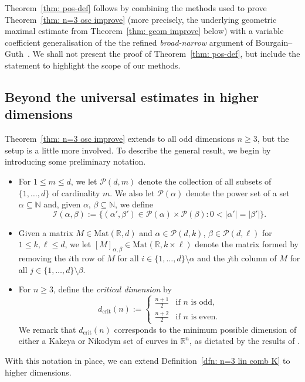 \documentclass[reqno]{amsart}
\numberwithin{equation}{section}
\newcommand{\N}{\mathbb{N}}
\newcommand{\R}{\mathbb{R}}
\newcommand{\cI}{\mathcal{I}}
\newcommand{\cP}{\mathcal{P}}
\theoremstyle{plain}
\theoremstyle{definition}
\newcommand{\crit}{\mathrm{crit}}
\begin{document}
Theorem~\ref{thm: pos-def} follows by combining the methods used to prove Theorem~\ref{thm: n=3 osc improve} (more precisely, the underlying geometric maximal estimate from Theorem~\ref{thm: geom improve} below) with a variable coefficient generalisation of the the refined \textit{broad-narrow} argument of Bourgain--Guth~\cite[\S4]{BG2011}. We shall not present the proof of Theorem~\ref{thm: pos-def}, but include the statement to highlight the scope of our methods. 




\subsection{Beyond the universal estimates in higher dimensions}\label{subsec: beyond higher} Theorem~\ref{thm: n=3 osc improve} extends to all odd dimensions $n \geq 3$, but the setup is a little more involved. To describe the general result, we begin by introducing some preliminary notation. 
\begin{itemize}
    \item For $1 \leq m \leq d$, we let $\cP(d,m)$ denote the collection of all subsets of $\{1, \dots, d\}$ of cardinality $m$. We also let $\cP(\alpha)$ denote the power set of a set $\alpha \subseteq \N$ and, given $\alpha$, $\beta \subseteq \N$, we define
    \begin{equation*}
        \cI(\alpha,\beta) := \{(\alpha',\beta') \in \cP(\alpha) \times \cP(\beta) : 0 < |\alpha'| = |\beta'|\}.
    \end{equation*} 
    \item Given a matrix $M \in \mathrm{Mat}(\R, d)$ and $\alpha \in \cP(d, k)$, $\beta \in \cP(d,\ell)$ for $1 \leq k, \ell \leq d$, we let $[M]_{\alpha, \beta} \in \mathrm{Mat}(\R, k \times \ell)$ denote the matrix formed by removing the $i$th row of $M$ for all $i \in \{1, \dots, d\} \setminus \alpha$ and the $j$th column of $M$ for all $j \in \{1, \dots, d\} \setminus \beta$.
    \item For $n \geq 3$, define the \textit{critical dimension} by
\begin{equation*}
    d_{\crit}(n) :=
    \begin{cases}
        \frac{n+1}{2} & \textrm{if $n$ is odd,} \\
        \frac{n+2}{2} & \textrm{if $n$ is even.}
    \end{cases}
\end{equation*}
We remark that $d_{\crit}(n)$ corresponds to the minimum possible dimension of either a Kakeya or Nikodym set of curves in $\R^n$, as dictated by the results of \cite{Wisewell2005, BG2011}. 
\end{itemize}
With this notation in place, we can extend Definition~\ref{dfn: n=3 lin comb K} to higher dimensions.
\end{document}
